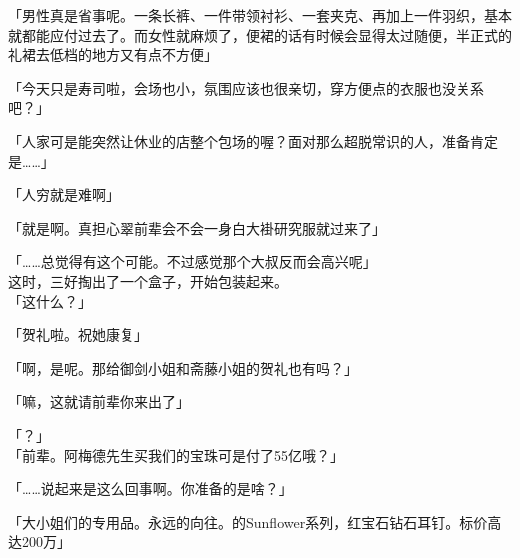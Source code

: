 「男性真是省事呢。一条长裤、一件带领衬衫、一套夹克、再加上一件羽织，基本就都能应付过去了。而女性就麻烦了，便裙的话有时候会显得太过随便，半正式的礼裙去低档的地方又有点不方便」

「今天只是寿司啦，会场也小，氛围应该也很亲切，穿方便点的衣服也没关系吧？」

「人家可是能突然让休业的店整个包场的喔？面对那么超脱常识的人，准备肯定是……」

「人穷就是难啊」

「就是啊。真担心翠前辈会不会一身白大褂研究服就过来了」

「……总觉得有这个可能。不过感觉那个大叔反而会高兴呢」\\

这时，三好掏出了一个盒子，开始包装起来。\\

「这什么？」

「贺礼啦。祝她康复」

「啊，是呢。那给御剑小姐和斋藤小姐的贺礼也有吗？」

「嘛，这就请前辈你来出了」

「？」\\

「前辈。阿梅德先生买我们的宝珠可是付了55亿哦？」

「……说起来是这么回事啊。你准备的是啥？」

「大小姐们的专用品。永远的向往。的Sunflower系列，红宝石钻石耳钉。标价高达200万」

